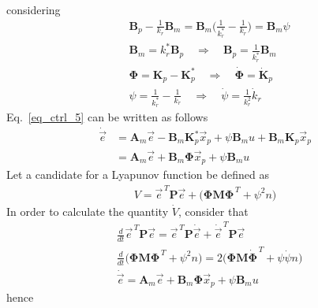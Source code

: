 \documentclass[12pt,a4paper,oneside]{book}
\begin{document}
\begin{onehalfspace}
\begin{equation}
\begin{aligned}
	\end{aligned}
\end{equation}
considering 
\begin{align}\label{eq_ctrl_6}
	&\mathbf{B}_p-\frac{1}{k_r}\mathbf{B}_m=\mathbf{B}_m\Big(\frac{1}{k_r^*}-\frac{1}{k_r}\Big) = \mathbf{B}_m\psi\\[6pt]
	&\mathbf{B}_m = k_r^*\mathbf{B}_p\quad\Rightarrow\quad\mathbf{B}_p = \frac{1}{k_r^*}\mathbf{B}_m \\[6pt]
	&\mathbf{\Phi} = \mathbf{K}_p -\mathbf{K}_p^* \quad\Rightarrow\quad\dot{\mathbf{\Phi}}= \dot{\mathbf{K}}_p \\[6pt]
	&{\psi} = \frac{1}{k_r^*}-\frac{1}{k_r} \quad\Rightarrow\quad \dot{\psi}=\frac{1}{k_r^2}\dot{k}_r
\end{align}
Eq.~\ref{eq_ctrl_5} can be written as follows
\begin{equation}\label{eq_ctrl_7}
	\begin{aligned}
		\dot{\vec{e}} &= \mathbf{A}_m\vec{e}-\mathbf{B}_m\mathbf{K}_p^*\vec{x}_p + \psi \mathbf{B}_m u + \mathbf{B}_m\mathbf{K}_p\vec{x}_p  \\[6pt]
		&= \mathbf{A}_m\vec{e}+\mathbf{B}_m\mathbf{\Phi}\vec{x}_p + \psi \mathbf{B}_m u
	\end{aligned}
\end{equation}
Let a candidate for a Lyapunov function be defined as 
\begin{equation}\label{eq_ctrl_8}
	\begin{aligned}
		V=\vec{e}^{\,T}\mathbf{P}\vec{e} + \Big(\mathbf{\Phi}\mathbf{M}\mathbf{\Phi}^{\,T} + \psi^2n\Big)
	\end{aligned}
\end{equation}
In order to calculate the quantity $\dot{V}$, consider that
\begin{equation*}
	\begin{aligned}
		&\frac{d}{dt}\vec{e}^{\,T}\mathbf{P}\vec{e} = \vec{e}^{\,T}\mathbf{P}\dot{\vec{e}} + \dot{\vec{e}}^{\,T}\mathbf{P}\vec{e} \\[6pt]
		&\frac{d}{dt}\Big(\mathbf{\Phi}\mathbf{M}\mathbf{\Phi}^{\,T} + \psi^2n\Big) = 2\Big(\mathbf{\Phi}\mathbf{M}\dot{\mathbf{\Phi}}^{\,T} + \psi\dot{\psi}n\Big)  \\[6pt]
		&\dot{\vec{e}} = \mathbf{A}_m\vec{e}+\mathbf{B}_m\mathbf{\Phi}\vec{x}_p + \psi \mathbf{B}_m u
	\end{aligned}
\end{equation*}
hence
\begin{equation}\label{eq_ctrl_9}
	\begin{aligned}

\end{aligned}
\end{equation}
\end{onehalfspace}
\end{document}

